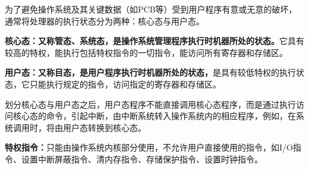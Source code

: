 {为了避免操作系统及其关键数据（如PCB等）受到用户程序有意或无意的破坏，通常将处理器的执行状态分为两种：核心态与用户态。}

\textbf{{核心态：}又称管态、系统态，是操作系统管理程序执行时机器所处的状态。}它具有较高的特权，能执行包括特权指令的一切指令，能访问所有寄存器和存储区。

\textbf{{用户态：}又称目态，是用户程序执行时机器所处的状态，}是具有较低特权的执行状态，它只能执行规定的指令，访问指定的寄存器和存储区。

划分核心态与用户态之后，用户态程序不能直接调用核心态程序，而是通过执行访问核心态的命令，引起中断，由中断系统转入操作系统内的相应程序，例如，在系统调用时，将由用户态转换到核心态。

\textbf{特权指令：}只能由操作系统内核部分使用，不允许用户直接使用的指令，如I/O指令、设置中断屏蔽指令、清内存指令、存储保护指令、设置时钟指令。
